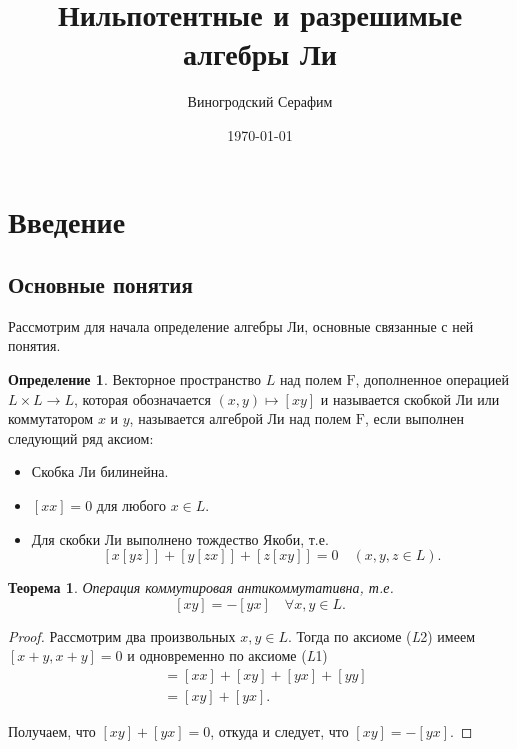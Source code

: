 \documentclass[a4paper, 12pt]{article}
\title{Нильпотентные и разрешимые алгебры Ли}
\author{Виногродский Серафим}
\date{\today}
\newtheorem{theorem}{Теорема}[section]
\theoremstyle{definition}
\newtheorem{definition}{Определение}[section]
\begin{document}
\maketitle
\tableofcontents
\thispagestyle{empty}
\pagebreak

\section{Введение}%
\label{sec:introduction}

\subsection{Основные понятия}%
\label{sec:definitions}

Рассмотрим для начала определение алгебры Ли, основные связанные с ней понятия.

\begin{definition}
    \label{def:lie_algebra}
    Векторное пространство \( L \) над полем \( \mathrm F \), дополненное операцией \( L \times L \to L \), которая обозначается \( (x ,y) \mapsto [xy] \) и называется скобкой Ли или коммутатором \( x \) и \( y \), называется алгеброй Ли над полем \( \mathrm F \), если выполнен следующий ряд аксиом:
    \begin{itemize}
        \item[(\textit{L}1)] Скобка Ли билинейна.
        \item[(\textit{L}2)] \( [x x] = 0 \) для любого \( x \in L \).
        \item[(\textit{L}3)] Для скобки Ли выполнено тождество Якоби, т.е.
            \[
                [x[yz]] + [y[zx]] + [z[xy]] = 0 \quad (x, y, z \in L).
            \]
    \end{itemize}
\end{definition}

\begin{theorem}%
    \label{theorem:commutator_anticommutativity}
    Операция коммутировая антикоммутативна, т.е.
    \[
        [x y] = -[y x] \quad \forall x, y \in L.
    \]
\end{theorem}
\begin{proof}
    Рассмотрим два произвольных \( x, y \in L \). Тогда по аксиоме (\textit{L}2) имеем \( [x + y, x + y] = 0 \) и одновременно по аксиоме (\textit{L}1)
    \begin{align*}
        [x + y, x + y]
        &= [x x] + [x y] + [y x] + [y y] \\
        &= [x y] + [y x].
    \end{align*}

    Получаем, что \( [x y] + [y x] = 0 \), откуда и следует, что \( [x y] = -[y x] \).
\end{proof}
\end{document}
